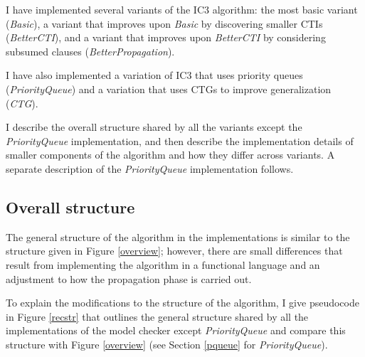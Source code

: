 \documentclass[12pt,a4paper,twoside,openright]{report}
\begin{document}
{I have implemented several variants of the IC3 algorithm:
the most basic variant (\emph{Basic}), a variant that
improves upon \emph{Basic} by discovering smaller CTIs (\emph{BetterCTI}),
and a variant that improves upon \emph{BetterCTI} by considering subsumed clauses
(\emph{BetterPropagation}).

I have also implemented a variation of IC3 that uses priority queues (\emph{PriorityQueue}) and a
variation that uses CTGs to improve generalization (\emph{CTG}).

I describe the overall structure shared by all the variants except the
\emph{PriorityQueue} implementation, and then describe the implementation
details of smaller components of the algorithm and how they differ across
variants. A separate description of the \emph{PriorityQueue} implementation
follows.

\subsection{Overall structure}

The general structure of the algorithm in the implementations is similar
to the structure given in Figure \ref{overview}; however, there are
small differences that result from implementing the algorithm in a
functional language and an adjustment to how the propagation phase is
carried out.

To explain the modifications to the structure of the algorithm,
I give pseudocode in Figure \ref{recstr}
that outlines the general structure shared by all the
implementations of the model checker except {\it PriorityQueue}
and compare this structure with Figure \ref{overview} (see Section
\ref{pqueue} for \emph{PriorityQueue}).

}
\end{document}

